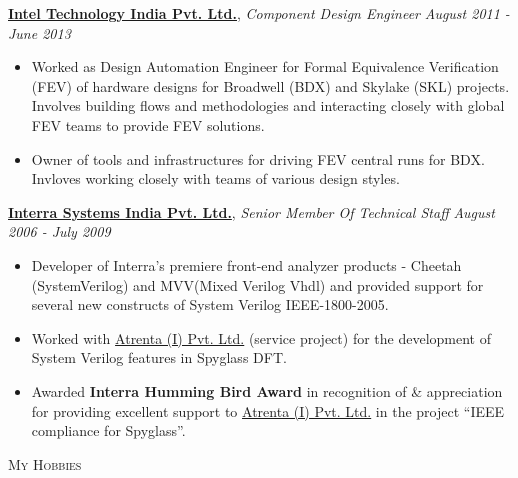 \documentclass[9pt]{article}
\newenvironment{changemargin}[2]{%
  \begin{list}{}{%
    \setlength{\topsep}{0pt}%
    \setlength{\leftmargin}{#1}%
    \setlength{\rightmargin}{#2}%
    \setlength{\listparindent}{\parindent}%
    \setlength{\itemindent}{\parindent}%
    \setlength{\parsep}{\parskip}%
  }%
  \item[]}{\end{list}
}
\newcommand{\lineover}{
	\begin{changemargin}{-0.05in}{-0.05in}
		\vspace*{-8pt}
		\hrulefill \\
		\vspace*{-2pt}
	\end{changemargin}
}
\newcommand{\header}[1]{
	\begin{changemargin}{-0.5in}{-0.5in}
		\scshape{#1}\\
  	\lineover
	\end{changemargin}
}
\newenvironment{body} {
	\vspace*{-16pt}
	\begin{changemargin}{-0.25in}{-0.5in}
  }	
	{\end{changemargin}
}
\begin{document}
\begin{body}
	\href{http://www.intel.in/content/www/in/en/homepage.html}{\textbf{Intel Technology India Pvt. Ltd.}}, \emph{Component Design Engineer} \hfill \emph{August 2011 - June 2013}\\
	\vspace*{-4pt}
	\begin{itemize} \itemsep -0pt  %
                \item Worked as Design Automation Engineer for Formal Equivalence Verification (FEV) of hardware designs for Broadwell (BDX) and Skylake (SKL) projects. Involves
                building flows and methodologies and interacting closely with
                global FEV teams to provide FEV solutions.
                \item Owner of tools and infrastructures for driving
                FEV central runs for  BDX. Invloves working closely with teams of various
                design styles.
                \end{itemize}

	\href{http://www.interrasystems.com/}{\textbf {Interra Systems India Pvt. Ltd.}}, \emph{Senior Member Of Technical Staff} \hfill \emph{August 2006 - July 2009}\\
	\vspace*{-4pt}
	\begin{itemize} \itemsep -0pt
		\item Developer of Interra's premiere front-end analyzer products - Cheetah (SystemVerilog) and MVV(Mixed Verilog Vhdl) and 
		provided support for several new constructs of System Verilog IEEE-1800-2005. 
		\item Worked with \href{http://www.atrenta.com/}{Atrenta (I) Pvt. Ltd.} (service project) for the development of System Verilog features in Spyglass DFT.
		\item Awarded \textbf{Interra Humming Bird Award} in recognition of \& appreciation for providing excellent support to \href{}{Atrenta (I) Pvt. Ltd.} in the project ``IEEE compliance for Spyglass''.
	\end{itemize}
\end{body}

\smallskip

\header{My Hobbies}
\end{document}
